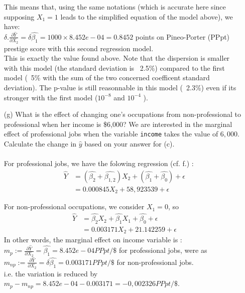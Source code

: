 \documentclass[12pt,letterpaper]{article}
\begin{document}
\begin{enumerate}
	This means that, using the same notations (which is accurate here since supposing $X_1=1$ leads to the simplified equation of the model above), we have:\\
	$\delta. \frac{\partial \hat{Y}}{\partial X_2}= \delta \hat{\beta_1} = 1000 \times 8.452e-04 = 0.8452$ points on Pineo-Porter (PPpt) prestige score with this second regression model. \\
	This is exactly the value found above. Note that the dispersion is smaller with this model (the standard deviation is ~2.5\%) compared to the first model (~5\% with the sum of
	 the two concerned coefficent standard deviation). The p-value is still reasonnable in this model (~2.3\%) even if its stronger with the first model ($10^{-8}$ and $10^{-4}$ ).

	\item [(g)]
	What is the effect of changing one's occupations from non-professional to professional when her income is \$6,000? We are interested in the marginal effect of professional jobs when the variable \texttt{income} takes the value of $6,000$. Calculate the change in $\hat{y}$ based on your answer for (c).\\
	\\
	For professional jobs, we have the folowing regression (cf. f.) :
	\begin{align*}
				 \hat{Y} &= (\hat{\beta_2} + \hat{\beta_{1,2}} )X_2 + (\hat{\beta_1} + \hat{\beta_0}) + \epsilon \\
				&=   0.000845X_2 + 58,923539  +\epsilon
	\end{align*}
	
	For non-professional occupations, we consider $X_1=0$, so
	\begin{align*}
				 \hat{Y} &= \hat{\beta_2} X_2 + \hat{\beta_1} X_1+  \hat{\beta_0} + \epsilon \\
				&=     0.003171   X_2 +  21.142259       + \epsilon
	\end{align*}
	In other words, the marginal effect on income variable is :\\
	$ m_p :=\frac{\partial \hat{Y}}{\partial X_2}=  \hat{\beta_1} = 8.452e-04 PPpt/\$$ for professional jobs, were as \\
	$ m_{np}:=\frac{\partial \hat{Y}}{\partial X_2}= \delta \hat{\beta_1} =  0.003171 PPpt/\$$ for non-professional jobs.\\
	i.e. the variation is reduced by $ m_p - m_{np} = 8.452e-04 -  0.003171 = - 0,002326 PPpt/\$$.
	
	
	
\end{enumerate}
\end{document}
